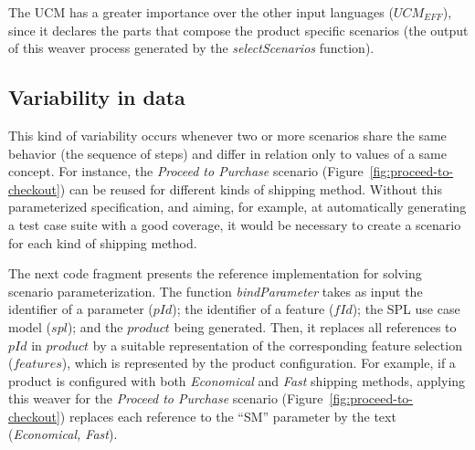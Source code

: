 \documentclass{acm_proc_article-sp}
\begin{document}
The UCM has a greater importance over the other input languages ($UCM_{EFF}$),
since it declares the parts that compose the product specific scenarios (the
output of this weaver process generated by the \emph{selectScenarios} function).

\subsection{Variability in data}\label{sub:bind-weaver}

This kind of variability occurs whenever two or more scenarios share the same
behavior (the sequence of steps) and differ in relation only to values of a same
concept. For instance, the \emph{Proceed to Purchase} scenario
(Figure~\ref{fig:proceed-to-checkout}) can be reused for different kinds
of shipping method. Without this parameterized specification, and aiming, for
example, at automatically generating a test case suite with a good coverage, it
would be necessary to create a scenario for each kind of shipping method.




The next code fragment presents the reference implementation for solving scenario
parameterization. The function \emph{bindParameter} takes as input the identifier
of a parameter ($pId$); the identifier of a feature ($fId$); the SPL use case model ($spl$); and the
$product$ being generated. Then, it replaces all references to $pId$ in
$product$ by a suitable representation of the corresponding feature selection ($features$), which is represented by the product configuration.
For example, if a product is configured with both \emph{Economical} and \emph{Fast}
shipping methods, applying this weaver for the \emph{Proceed to
Purchase} scenario (Figure~\ref{fig:proceed-to-checkout}) replaces each reference to the ``SM'' parameter by
the text (\emph{Economical, Fast}).
\end{document}
